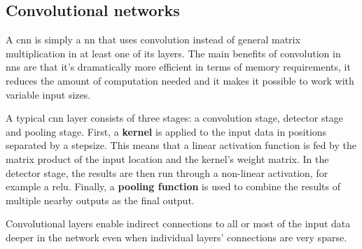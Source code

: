 \subsection{Convolutional networks}

A \ac{cnn} is simply a \ac{nn} that uses convolution instead of general matrix
multiplication in at least one of its layers. The main benefits of convolution in \ac{nn}s
are that it's dramatically more efficient in terms of memory requirements, it reduces
the amount of computation needed and it makes it possible to work with variable input
sizes.

A typical \ac{cnn} layer consists of three stages: a convolution stage, detector stage
and pooling stage. First, a \textbf{kernel} is applied to the input data in positions
separated by a stepsize. This means that a linear activation function is fed by the
matrix product of the input location and the kernel's weight matrix. In the detector
stage, the results are then run through a non-linear activation, for example a \ac{relu}.
Finally, a \textbf{pooling function} is used to combine the results of multiple nearby
outputs as the final output.

Convolutional layers enable indirect connections to all or most of the input data deeper
in the network even when individual layers' connections are very sparse.
